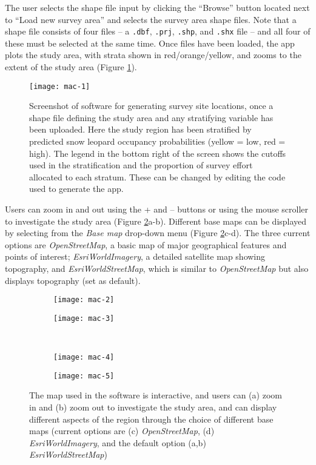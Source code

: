 \documentclass[a4paper,11pt, draft]{article} %
\begin{document}
The user selects the shape file input by clicking the ``Browse'' button located next to ``Load new survey area'' and selects the survey area shape files. Note that a shape file consists of four files -- a \texttt{.dbf}, \texttt{.prj}, \texttt{.shp}, and \texttt{.shx} file -- and all four of these must be selected at the same time. Once files have been loaded, the app plots the study area, with strata shown in red/orange/yellow, and zooms to the extent of the study area (Figure \ref{mac-1}). 

\begin{figure}[htbp]
\centering
\texttt{[image: mac-1]}
\caption{Screenshot of software for generating survey site locations, once a shape file defining the study area and any stratifying variable has been uploaded. Here the study region has been stratified by predicted snow leopard occupancy probabilities (yellow = low, red = high). The legend in the bottom right of the screen shows the cutoffs used in the stratification and the proportion of survey effort allocated to each stratum. These can be changed by editing the code used to generate the app.}
\label{mac-1}
\end{figure}

Users can zoom in and out using the + and -- buttons or using the mouse scroller to investigate the study area (Figure \ref{mac-2345}a-b). Different base maps can be displayed by selecting from the \textit{Base map} drop-down menu (Figure \ref{mac-2345}c-d). The three current options are \textit{OpenStreetMap}, a basic map of major geographical features and points of interest; \textit{EsriWorldImagery}, a detailed satellite map showing topography, and \textit{EsriWorldStreetMap}, which is similar to \textit{OpenStreetMap} but also displays topography (set as default).  

\begin{figure}[htbp]
\centering
  \begin{subfigure}[b]{0.49\textwidth}
    \texttt{[image: mac-2]}
    \caption{}
  \end{subfigure}
  \begin{subfigure}[b]{0.49\textwidth}
    \texttt{[image: mac-3]}
    \caption{}
  \end{subfigure} \\
    \begin{subfigure}[b]{0.49\textwidth}
    \texttt{[image: mac-4]}
    \caption{}
  \end{subfigure}
  \begin{subfigure}[b]{0.49\textwidth}
    \texttt{[image: mac-5]}
    \caption{}
  \end{subfigure}
\caption{The map used in the software is interactive, and users can (a) zoom in and (b) zoom out to investigate the study area, and can display different aspects of the region through the choice of different base maps (current options are (c) \textit{OpenStreetMap}, (d) \textit{EsriWorldImagery}, and the default option (a,b) \textit{EsriWorldStreetMap})}
\label{mac-2345}
\end{figure}
\end{document}
